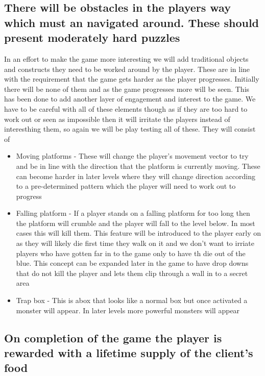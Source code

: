 \documentclass{article}
\begin{document}
\subsection{ There will be obstacles in the players way which must an navigated around. These should present moderately hard puzzles }
In an effort to make the game more interesting we will add traditional objects and constructs they need to be worked around by the player. These are in line with the requirement that the game gets harder as the player progresses. Initially there will be none of them and as the game progresses more will be seen. This has been done to add another layer of engagement and interest to the game. We have to be careful with all of these elements though as if they are too hard to work out or seen as impossible then it will irritate the players instead of interesthing them, so again we will be play testing all of these.
They will consist of
\begin{itemize}
\item Moving platforms - These will change the player's movement vector to try and be in line with the direction that the platform is currently moving. These can become harder in later levels where they will change direction according to a pre-determined pattern which the player will need to work out to progress
\item Falling platform - If a player stands on a falling platform for too long then the platform will crumble and the player will fall to the level below. In most cases this will kill them. This feature will be introduced to the player early on as they will likely die first time they walk on it and we don't want to irriate players who have gotten far in to the game only to have th die out of the blue. This concept can be expanded later in the game to have drop downs that do not kill the player and lets them clip through a wall in to a secret area
\item Trap box - This is abox that looks like a normal box but once activated a monster will appear. In later levels more powerful monsters will appear
\end{itemize}

\subsection{ On completion of the game the player is rewarded with a lifetime supply of the client's food }



\end{document}
